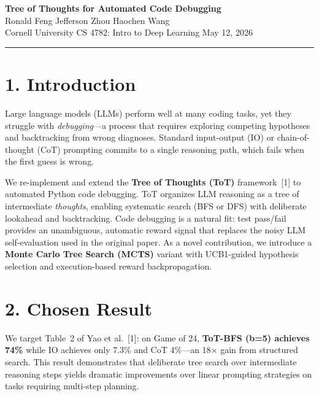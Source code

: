 \documentclass[11pt,letterpaper]{article}
\begin{document}
\begin{center}
  {\large\textbf{Tree of Thoughts for Automated Code Debugging}}\\[3pt]
  {\normalsize Ronald Feng \quad Jefferson Zhou \quad Haochen Wang}\\[1pt]
  {\small Cornell University \quad CS 4782: Intro to Deep Learning \quad May 12, 2026}
\end{center}
\vspace{-4pt}\hrule\vspace{5pt}

\section*{1. Introduction}

Large language models (LLMs) perform well at many coding tasks, yet they struggle with
\emph{debugging}—a process that requires exploring competing hypotheses and backtracking from
wrong diagnoses. Standard input-output (IO) or chain-of-thought (CoT) prompting commits to a
single reasoning path, which fails when the first guess is wrong.

We re-implement and extend the \textbf{Tree of Thoughts (ToT)} framework~[1] to automated
Python code debugging. ToT organizes LLM reasoning as a tree of intermediate \emph{thoughts},
enabling systematic search (BFS or DFS) with deliberate lookahead and backtracking. Code
debugging is a natural fit: test pass/fail provides an unambiguous, automatic reward signal
that replaces the noisy LLM self-evaluation used in the original paper.
As a novel contribution, we introduce a \textbf{Monte Carlo Tree Search (MCTS)} variant with
UCB1-guided hypothesis selection and execution-based reward backpropagation.

\section*{2. Chosen Result}

We target Table~2 of Yao et al.~[1]: on Game of 24, \textbf{ToT-BFS (b=5) achieves 74\%} while
IO achieves only 7.3\% and CoT 4\%---an 18$\times$ gain from structured search. This result
demonstrates that deliberate tree search over intermediate reasoning steps yields dramatic
improvements over linear prompting strategies on tasks requiring multi-step planning.
\end{document}
